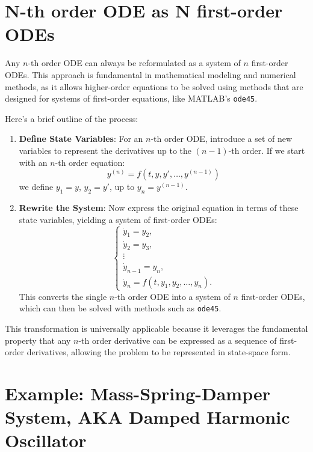\documentclass{article}
\begin{document}
\section*{N-th order ODE as N first-order ODEs}

Any \( n \)-th order ODE can always be reformulated as a system of \( n \) first-order ODEs. This approach is fundamental in mathematical modeling and numerical methods, as it allows higher-order equations to be solved using methods that are designed for systems of first-order equations, like MATLAB’s \texttt{ode45}.

Here’s a brief outline of the process:

\begin{enumerate}
    \item \textbf{Define State Variables}: For an \( n \)-th order ODE, introduce a set of new variables to represent the derivatives up to the \( (n-1) \)-th order. If we start with an \( n \)-th order equation:
    \[
    y^{(n)} = f(t, y, y', \dots, y^{(n-1)})
    \]
    we define \( y_1 = y \), \( y_2 = y' \), up to \( y_n = y^{(n-1)} \).
    
    \item \textbf{Rewrite the System}: Now express the original equation in terms of these state variables, yielding a system of first-order ODEs:
    \[
    \begin{cases}
        \dot{y}_1 = y_2, \\
        \dot{y}_2 = y_3, \\
        \vdots \\
        \dot{y}_{n-1} = y_n, \\
        \dot{y}_n = f(t, y_1, y_2, \dots, y_n).
    \end{cases}
    \]
    This converts the single \( n \)-th order ODE into a system of \( n \) first-order ODEs, which can then be solved with methods such as \texttt{ode45}.
\end{enumerate}

This transformation is universally applicable because it leverages the fundamental property that any \( n \)-th order derivative can be expressed as a sequence of first-order derivatives, allowing the problem to be represented in state-space form.

\section*{Example: Mass-Spring-Damper System, AKA Damped Harmonic Oscillator}
\end{document}
